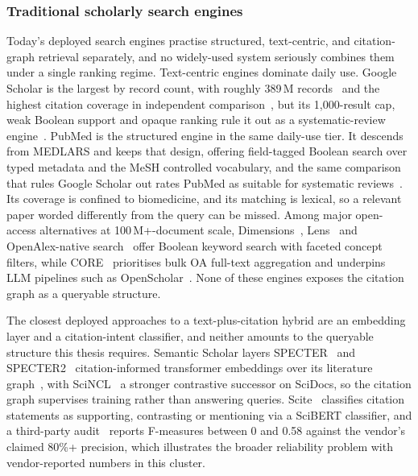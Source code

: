 \subsubsection{Traditional scholarly search engines}
\label{subsec:traditional-search}

Today's deployed search engines practise structured, text-centric, and
citation-graph retrieval separately, and no widely-used system seriously
combines them under a single ranking regime. Text-centric engines dominate daily use. Google
Scholar is the largest by record count, with roughly 389\,M
records~\cite{gusenbauer2019gs} and the highest citation coverage in independent
comparison~\cite{martinmartin2021coverage}, but its 1{,}000-result cap, weak
Boolean support and opaque ranking rule it out as a systematic-review
engine~\cite{gusenbauerhaddaway2020}.
PubMed is the structured engine in the same daily-use tier. It descends from
MEDLARS and keeps that design, offering field-tagged Boolean search over
typed metadata and the MeSH controlled vocabulary, and the same comparison
that rules Google Scholar out rates PubMed as suitable for systematic
reviews~\cite{gusenbauerhaddaway2020}. Its coverage is confined to
biomedicine, and its matching is lexical, so a relevant paper worded
differently from the query can be missed. Among major open-access alternatives at
100\,M+-document scale, Dimensions~\cite{herzog2020dimensions},
Lens~\cite{jefferson2018lens} and OpenAlex-native
search~\cite{priem2022openalex} offer Boolean keyword search with faceted
concept filters, while CORE~\cite{knoth2012core,knoth2023core} prioritises
bulk OA full-text aggregation and underpins LLM pipelines such as
OpenScholar~\cite{asai2024openscholar}. None of these engines exposes the
citation graph as a queryable structure.

The closest deployed approaches to a text-plus-citation hybrid are an
embedding layer and a citation-intent classifier, and neither amounts to the
queryable structure this thesis requires.  Semantic Scholar layers
SPECTER~\cite{cohan2020specter} and SPECTER2~\cite{singh2023scirepeval}
citation-informed transformer embeddings over its literature
graph~\cite{ammar2018construction,kinney2023semanticscholar}, with
SciNCL~\cite{ostendorff2022scincl} a stronger contrastive successor on
SciDocs, so the citation graph supervises training rather than answering
queries.  Scite~\cite{nicholson2021scite} classifies citation statements as
supporting, contrasting or mentioning via a SciBERT classifier, and a
third-party audit~\cite{bakker2023evaluating} reports F-measures between 0
and 0.58 against the vendor's claimed 80\%+ precision, which illustrates the
broader reliability problem with vendor-reported numbers in this cluster.

